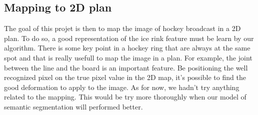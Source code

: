 \subsection{Mapping to 2D plan}
The goal of this projet is then to map the image of hockey broadcast in a 2D plan. To do so, a good representation of the ice rink feature must be learn by our algorithm. There is some key point in a hockey ring that are always at the same spot and that is really usefull to map the image in a plan. For example, the joint between the line and the board is an important feature. Be positioning the well recognized pixel on the true pixel value in the 2D map, it's possible to find the good deformation to apply to the image. As for now, we hadn't try anything related to the mapping. This would be try more thoroughly when our model of semantic segmentation will performed better. 
